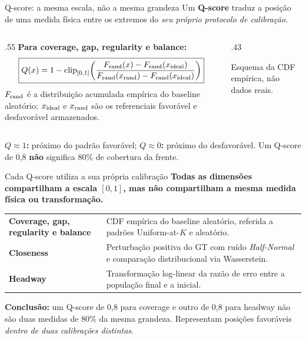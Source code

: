 \begin{frame}{Q-score: a mesma escala, não a mesma grandeza}
Um \textbf{Q-score} traduz a posição de uma medida física entre os extremos do \emph{seu próprio protocolo de calibração}.
\begin{columns}[T,onlytextwidth]
\begin{column}{.55\textwidth}
\textbf{Para coverage, gap, regularity e balance:}
\[
\boxed{\displaystyle
Q(x)=1-\operatorname{clip}_{[0,1]}
\!\left(\frac{F_{\rm rand}(x)-F_{\rm rand}(x_{\rm ideal})}
{F_{\rm rand}(x_{\rm rand})-F_{\rm rand}(x_{\rm ideal})}\right)}
\]
$F_{\rm rand}$ é a distribuição acumulada empírica do baseline aleatório; $x_{\rm ideal}$ e $x_{\rm rand}$ são os referenciais favorável e desfavorável armazenados.
\end{column}
\begin{column}{.43\textwidth}\centering
{}
\scriptsize Esquema da CDF empírica, não dados reais.
\end{column}
\end{columns}
\vspace{.10cm}\textbf{$Q\approx1$:} próximo do padrão favorável; \textbf{$Q\approx0$:} próximo do desfavorável. Um Q-score de 0,8 \textbf{não} significa 80\% de cobertura da frente.
\end{frame}

\begin{frame}{Cada Q-score utiliza a sua própria calibração}
\textbf{Todas as dimensões compartilham a escala $[0,1]$, mas não compartilham a mesma medida física ou transformação.}
\vspace{.12cm}
\renewcommand{\arraystretch}{1.22}
\begin{tabularx}{\linewidth}{@{}>{\bfseries}p{.30\linewidth}X@{}}
Coverage, gap, regularity e balance & CDF empírica do baseline aleatório, referida a padrões Uniform-at-$K$ e aleatório.\\
Closeness & Perturbação positiva do GT com ruído \emph{Half-Normal} e comparação distribucional via Wasserstein.\\
Headway & Transformação log-linear da razão de erro entre a população final e a inicial.\\
\end{tabularx}
\vspace{.24cm}
\textbf{Conclusão:} um Q-score de 0,8 para coverage e outro de 0,8 para headway não são duas medidas de 80\% da mesma grandeza. Representam posições favoráveis \emph{dentro de duas calibrações distintas}.
\end{frame}

